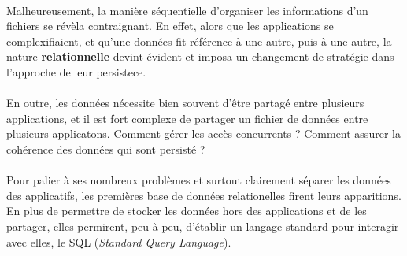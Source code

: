 {  \paragraph{} Malheureusement, la manière séquentielle d'organiser les informations d'un fichiers
  se révèla contraignant. En effet, alors que les applications se complexifiaient, et qu'une données
  fit référence à une autre, puis à une autre, la nature \textbf{relationnelle} devint évident et
  imposa un changement de stratégie dans l'approche de leur persistece.

  \paragraph{} En outre, les données nécessite bien souvent d'être partagé entre plusieurs
  applications, et il est fort complexe de partager un fichier de données entre plusieurs
  applicatons. Comment gérer les accès concurrents ? Comment assurer la cohérence des données qui
  sont persisté ?
  \paragraph{} Pour palier à ses nombreux problèmes et surtout clairement séparer les données des
  applicatifs, les premières base de données relationelles firent leurs apparitions. En plus de
  permettre de stocker les données hors des applications et de les partager, elles permirent, peu à
  peu, d'établir un langage standard pour interagir avec elles, le SQL (\textit{Standard Query
  Language}).
}

